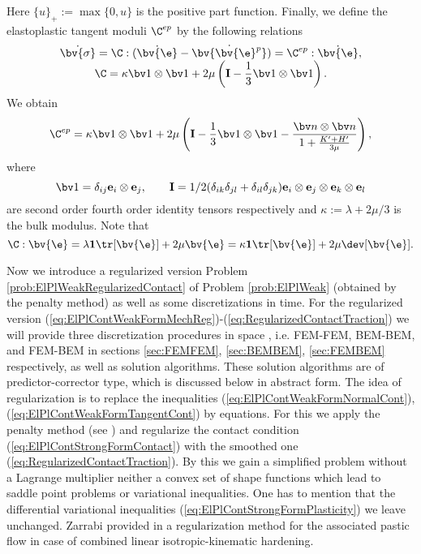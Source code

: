 Here $\{u\}_{+} := \max\{0,u\}$ is the positive part function.
Finally, we define the elastoplastic tangent moduli $\C^{ep}$ by the following relations
\begin{equation*}
\begin{array}{c}
\dot{\bv{\sigma}} = \C : (\dot{\bv{\e}} - \dot{\bv{\bv{\e}^p}}) = \C^{ep} : \dot{\bv{\e}}, \\
\C = \kappa \bv 1 \otimes \bv 1 
+ 2 \mu \left( \mathbf{I} - \dfrac{1}{3} \bv 1 \otimes \bv 1 \right).
\end{array}
\end{equation*}
We obtain
\[
\C^{ep} = \kappa \bv 1 \otimes \bv 1 
+ 2 \mu \left( \mathbf{I} - \dfrac{1}{3} \bv 1 \otimes \bv 1 
- \dfrac{\bv n \otimes \bv n}{1+ \frac{K'+H'}{3 \mu}}\right),
\]
where
\[
\bv 1 = \delta_{ij} \mathbf{e}_i \otimes \mathbf{e}_j, \qquad
\mathbf{I} = 1/2 (\delta_{ik} \delta_{jl} + \delta_{il} \delta_{jk})
\mathbf{e}_i \otimes \mathbf{e}_j \otimes \mathbf{e}_k \otimes \mathbf{e}_l
\]
are second order fourth order identity tensors respectively and $\kappa := \lambda + 2\mu/3$ is the bulk modulus. Note that 
\begin{equation} \label{elastdev}
\C : \bv{\e} = \lambda \mathbf{1}\tr[\bv{\e}] + 2\mu \bv{\e} = \kappa \mathbf{1} \tr[\bv{\e}] + 2 \mu \dev[\bv{\e}].
\end{equation}


Now we introduce  a regularized version Problem \ref{prob:ElPlWeakRegularizedContact} of Problem \ref{prob:ElPlWeak} (obtained by the penalty method) as well as some discretizations in time. For the regularized version (\ref{eq:ElPlContWeakFormMechReg})-(\ref{eq:RegularizedContactTraction}) we will provide three discretization procedures in space , i.e.  FEM-FEM, BEM-BEM, and FEM-BEM in sections \ref{sec:FEMFEM}, \ref{sec:BEMBEM}, \ref{sec:FEMBEM} respectively, as well as solution algorithms. These solution algorithms are of predictor-corrector type, which is  discussed below in abstract form. The idea of regularization is to replace the inequalities 
 (\ref{eq:ElPlContWeakFormNormalCont}), (\ref{eq:ElPlContWeakFormTangentCont}) by equations. For this we apply the penalty method (see \cite{Wri02,La03}) and regularize the contact condition (\ref{eq:ElPlContStrongFormContact}) with the smoothed one  (\ref{eq:RegularizedContactTraction}). By this we gain a simplified problem without a Lagrange multiplier neither a convex set of shape functions which lead to saddle point problems or variational inequalities. One has to mention that the differential variational inequalities (\ref{eq:ElPlContStrongFormPlasticity}) we leave unchanged. Zarrabi   provided in \cite[Section 5]{ZarrabiPhD} a regularization method for the associated pastic flow in case of combined linear isotropic-kinematic hardening. 

